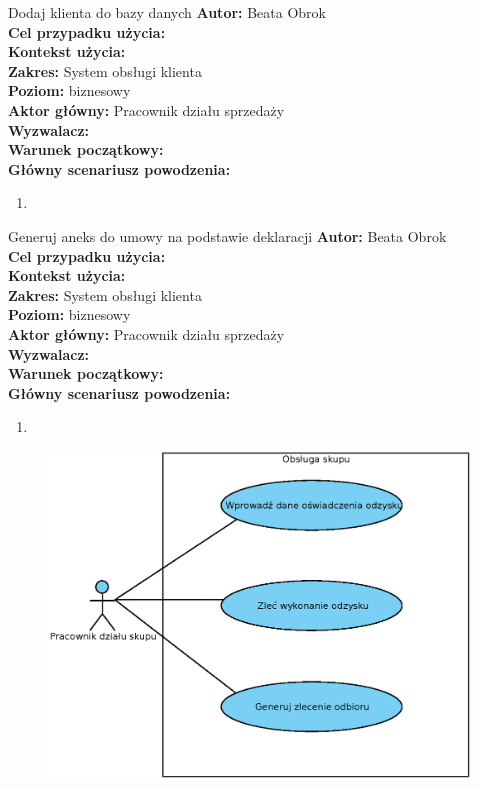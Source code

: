 \begin{usecase}{Dodaj klienta do bazy danych}
	\textbf{Autor:} Beata Obrok \\
	\textbf{Cel przypadku użycia:} \\
	\textbf{Kontekst użycia:} \\
	\textbf{Zakres:} System obsługi klienta \\
	\textbf{Poziom:} biznesowy \\
	\textbf{Aktor główny:} Pracownik działu sprzedaży \\
	\textbf{Wyzwalacz:} \\
	\textbf{Warunek początkowy:} \\
	\textbf{Główny scenariusz powodzenia:} \\
		\begin{enumerate}
			\item
		\end{enumerate}
\end{usecase}

\begin{usecase}{Generuj aneks do umowy na podstawie deklaracji}
	\textbf{Autor:} Beata Obrok \\
	\textbf{Cel przypadku użycia:} \\
	\textbf{Kontekst użycia:} \\
	\textbf{Zakres:} System obsługi klienta \\
	\textbf{Poziom:} biznesowy \\
	\textbf{Aktor główny:} Pracownik działu sprzedaży \\
	\textbf{Wyzwalacz:} \\
	\textbf{Warunek początkowy:} \\
	\textbf{Główny scenariusz powodzenia:} \\
		\begin{enumerate}
			\item
		\end{enumerate}
\end{usecase}

\begin{figure}[H]
	\centering
	\includegraphics[width=.8\textwidth]{img/UC/skup.eps}
\end{figure}

